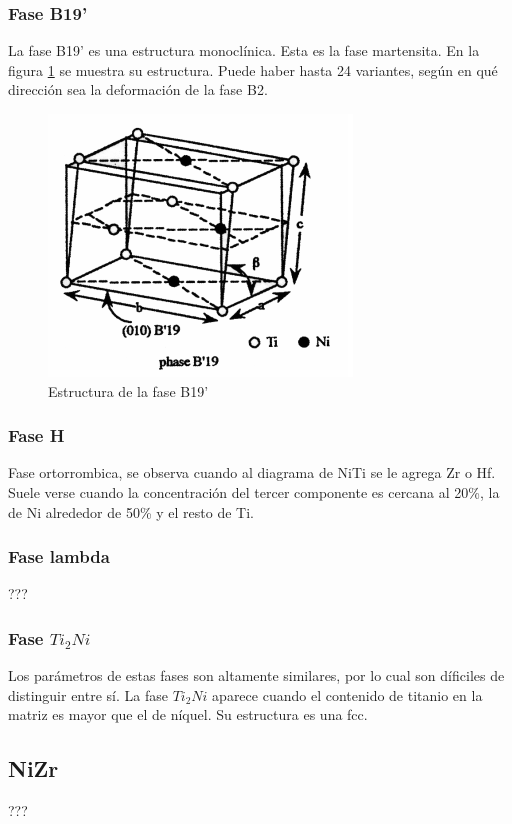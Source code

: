 \documentclass[12pt]{article}
\theoremstyle{definition}
\theoremstyle{remark}
\begin{document}
\subsubsection{Fase B19'}
La fase B19' es una estructura monoclínica. Esta es la fase martensita. En la figura \ref{B19pPhase} se muestra su estructura. Puede haber hasta 24 variantes, según en qué dirección sea la deformación de la fase B2.
\begin{figure}[H]
	\centering
	\includegraphics[scale=0.4]{img/B19pPhase.png}
	\caption{Estructura de la fase B19'}
	\label{B19pPhase}
\end{figure}

\subsubsection{Fase H}
Fase ortorrombica, se observa cuando al diagrama de NiTi se le agrega Zr o Hf. Suele verse cuando la concentración del tercer componente es cercana al 20\%, la de Ni alrededor de 50\% y el resto de Ti. 

\subsubsection{Fase lambda}
???

\subsubsection{Fase $Ti_2Ni$}

Los parámetros de estas fases son altamente similares, por lo cual son díficiles de distinguir entre sí. La fase $Ti_2Ni$ aparece cuando el contenido de titanio en la matriz es mayor que el de níquel. Su estructura es una fcc.

\subsection{NiZr}
???
\end{document}

